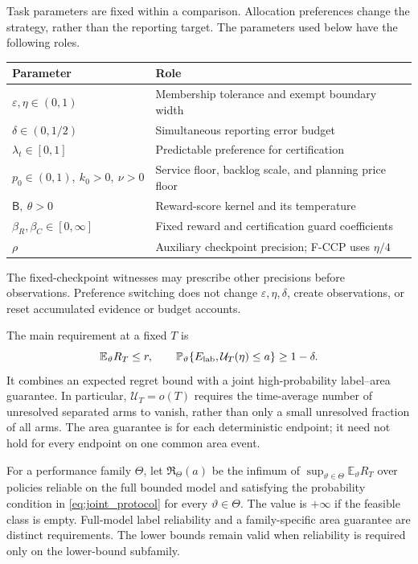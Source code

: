 \documentclass[11pt]{article}
\theoremstyle{remark}
\newcommand{\E}{\mathbb E}
\newcommand{\Prob}{\mathbb P}
\begin{document}
Task parameters are fixed within a comparison. Allocation preferences
change the strategy, rather than the reporting target. The parameters
used below have the following roles.
\begin{center}
\small
\begin{tabular}{lp{}}
\toprule
Parameter & Role\\
\midrule
$\varepsilon,\eta\in(0,1)$ & Membership tolerance and exempt boundary width\\
$\delta\in(0,1/2)$ & Simultaneous reporting error budget\\
$\lambda_t\in[0,1]$ & Predictable preference for certification\\
$p_0\in(0,1),\ k_0>0,\ \nu>0$ & Service floor, backlog scale, and planning price floor\\
$\mathsf B,\ \theta>0$ & Reward-score kernel and its temperature\\
$\beta_R,\beta_C\in[0,\infty]$ & Fixed reward and certification guard coefficients\\
$\rho$ & Auxiliary checkpoint precision; F-CCP uses $\eta/4$\\
\bottomrule
\end{tabular}
\end{center}
The fixed-checkpoint witnesses may prescribe other precisions before
observations. Preference switching does not change
$\varepsilon,\eta,\delta$, create observations, or reset accumulated
evidence or budget accounts.


The main requirement at a fixed $T$ is
\begin{equation}
 \E_\vartheta R_T\le r,\qquad
 \Prob_\vartheta\{E_{\rm lab},\mathcal U_T(\eta)\le a\}\ge1-\delta.
 \label{eq:joint_protocol}
\end{equation}
It combines an expected regret bound with a joint high-probability
label--area guarantee. In particular, $\mathcal U_T=o(T)$ requires the
time-average number of unresolved separated arms to vanish, rather than
only a small unresolved fraction of all arms. The area guarantee is for
each deterministic endpoint; it need not hold for every endpoint on one
common area event.

For a performance family $\Theta$, let $\mathfrak R_\Theta(a)$ be the
infimum of $\sup_{\vartheta\in\Theta}\E_\vartheta R_T$ over policies reliable on
the full bounded model and satisfying the probability condition in
\eqref{eq:joint_protocol} for every $\vartheta\in\Theta$. The value is
$+\infty$ if the feasible class is empty. Full-model label reliability
and a family-specific area guarantee are distinct requirements. The
lower bounds remain valid when reliability is required only on the
lower-bound subfamily.
\end{document}
